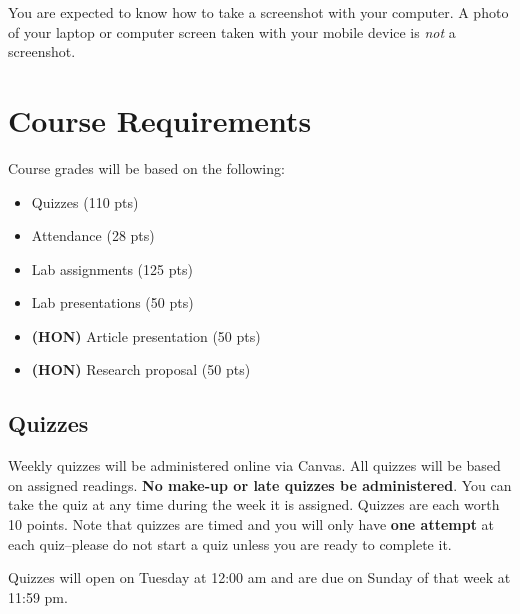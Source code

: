 \documentclass[
  letterpaper,
]{article}
\providecommand{\tightlist}{%
  \setlength{\itemsep}{0pt}\setlength{\parskip}{0pt}}\usepackage{longtable,booktabs,array}
\begin{document}
\begin{tcolorbox}[enhanced jigsaw, breakable, coltitle=black, opacityback=0, rightrule=.15mm, colframe=quarto-callout-note-color-frame, bottomtitle=1mm, opacitybacktitle=0.6, bottomrule=.15mm, left=2mm, toptitle=1mm, titlerule=0mm, title=\textcolor{quarto-callout-note-color}{\faInfo}\hspace{0.5em}{Note}, colback=white, arc=.35mm, toprule=.15mm, leftrule=.75mm, colbacktitle=quarto-callout-note-color!10!white]

You are expected to know how to take a screenshot with your computer. A
photo of your laptop or computer screen taken with your mobile device is
\emph{not} a screenshot.

\end{tcolorbox}

\section{Course Requirements}\label{sec-requirements}

Course grades will be based on the following:

\begin{itemize}
\tightlist
\item
  Quizzes (110 pts)
\item
  Attendance (28 pts)
\item
  Lab assignments (125 pts)
\item
  Lab presentations (50 pts)
\item
  \textbf{(HON)} Article presentation (50 pts)
\item
  \textbf{(HON)} Research proposal (50 pts)
\end{itemize}

\subsection{Quizzes}\label{quizzes}

Weekly quizzes will be administered online via Canvas. All quizzes will
be based on assigned readings. \textbf{No make-up or late quizzes be
administered}. You can take the quiz at any time during the week it is
assigned. Quizzes are each worth 10 points. Note that quizzes are timed
and you will only have \textbf{one attempt} at each quiz--please do not
start a quiz unless you are ready to complete it.

\begin{tcolorbox}[enhanced jigsaw, breakable, coltitle=black, opacityback=0, rightrule=.15mm, colframe=quarto-callout-important-color-frame, bottomtitle=1mm, opacitybacktitle=0.6, bottomrule=.15mm, left=2mm, toptitle=1mm, titlerule=0mm, title=\textcolor{quarto-callout-important-color}{\faExclamation}\hspace{0.5em}{Important}, colback=white, arc=.35mm, toprule=.15mm, leftrule=.75mm, colbacktitle=quarto-callout-important-color!10!white]

Quizzes will open on Tuesday at 12:00 am and are due on Sunday of that
week at 11:59 pm.

\end{tcolorbox}
\end{document}
